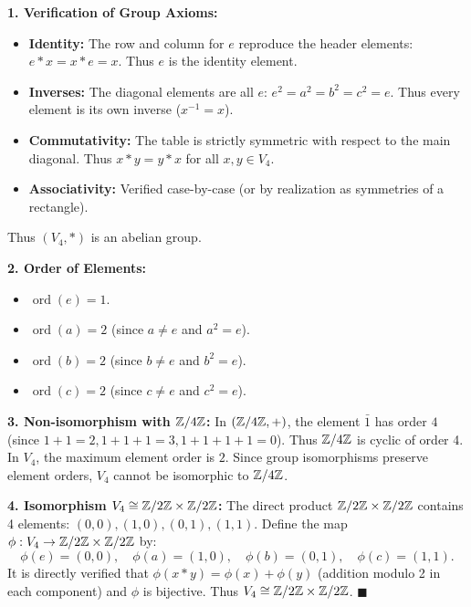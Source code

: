 \begin{solution}
\textbf{1. Verification of Group Axioms:}
\begin{itemize}[leftmargin=1.5em,itemsep=1pt]
  \item \textbf{Identity:} The row and column for $e$ reproduce the header elements: $e * x = x * e = x$. Thus $e$ is the identity element.
  \item \textbf{Inverses:} The diagonal elements are all $e$: $e^2 = a^2 = b^2 = c^2 = e$. Thus every element is its own inverse ($x^{-1} = x$).
  \item \textbf{Commutativity:} The table is strictly symmetric with respect to the main diagonal. Thus $x * y = y * x$ for all $x, y \in V_4$.
  \item \textbf{Associativity:} Verified case-by-case (or by realization as symmetries of a rectangle).
\end{itemize}
Thus $(V_4, *)$ is an abelian group.

\textbf{2. Order of Elements:}
\begin{itemize}[leftmargin=1.5em,itemsep=1pt]
  \item $\operatorname{ord}(e) = 1$.
  \item $\operatorname{ord}(a) = 2$ (since $a \ne e$ and $a^2 = e$).
  \item $\operatorname{ord}(b) = 2$ (since $b \ne e$ and $b^2 = e$).
  \item $\operatorname{ord}(c) = 2$ (since $c \ne e$ and $c^2 = e$).
\end{itemize}

\textbf{3. Non-isomorphism with $\mathbb{Z}/4\mathbb{Z}$:}
In $(\mathbb{Z}/4\mathbb{Z}, +)$, the element $\bar{1}$ has order $4$ (since $1+1=2, 1+1+1=3, 1+1+1+1=0$). Thus $\mathbb{Z}/4\mathbb{Z}$ is cyclic of order 4.
In $V_4$, the maximum element order is $2$.
Since group isomorphisms preserve element orders, $V_4$ cannot be isomorphic to $\mathbb{Z}/4\mathbb{Z}$.

\textbf{4. Isomorphism $V_4 \cong \mathbb{Z}/2\mathbb{Z} \times \mathbb{Z}/2\mathbb{Z}$:}
The direct product $\mathbb{Z}/2\mathbb{Z} \times \mathbb{Z}/2\mathbb{Z}$ contains 4 elements: $(0,0), (1,0), (0,1), (1,1)$.
Define the map $\phi: V_4 \to \mathbb{Z}/2\mathbb{Z} \times \mathbb{Z}/2\mathbb{Z}$ by:
\[
\phi(e) = (0, 0), \quad \phi(a) = (1, 0), \quad \phi(b) = (0, 1), \quad \phi(c) = (1, 1).
\]
It is directly verified that $\phi(x * y) = \phi(x) + \phi(y)$ (addition modulo 2 in each component) and $\phi$ is bijective. Thus $V_4 \cong \mathbb{Z}/2\mathbb{Z} \times \mathbb{Z}/2\mathbb{Z}$. \hfill $\blacksquare$
\end{solution}

